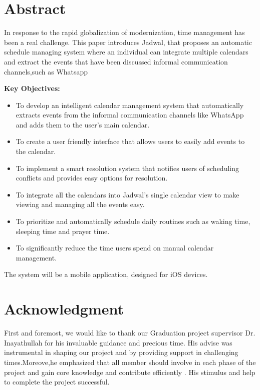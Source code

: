 \documentclass[12pt,a4paper]{report}
\begin{document}
\begin{singlespace}

\chapter*{Abstract}
    
\begin{justify}
In response to the rapid globalization of modernization, time management has been a real challenge. This paper introduces Jadwal, that proposes an automatic schedule managing system where an individual can integrate multiple calendars and extract the events that have been discussed informal communication channels,such as Whatsapp
  
\textbf{Key Objectives:}
\begin{itemize}
    \item To develop an intelligent calendar management system that automatically extracts events from the informal communication channels like WhatsApp and adds them to the user's main calendar.
    \item To create a user friendly interface that allows users to easily add events to the calendar.
    \item To implement a smart resolution system that notifies users of scheduling conflicts and provides easy options for resolution.
    \item To integrate all the calendars into Jadwal's single calendar view to make viewing and managing all the events easy.
    \item To prioritize and automatically schedule daily routines such as waking time, sleeping time and prayer time.
    \item To significantly reduce the time users spend on manual calendar management.
    
\end{itemize}


\begin{center}
    The system will be a mobile application, designed for iOS devices.
    \end{center}
\end{justify}

    
\chapter*{Acknowledgment}
    
\begin{justify}
First and foremost, we would like to thank our Graduation project supervisor Dr. Inayathullah for his invaluable guidance and precious time. His advise was instrumental in shaping our project and by providing support in challenging times.Moreove,he emphasized that all member should involve in each phase of the project and gain core knowledge and contribute efficiently .
His stimulus and help to complete the project successful.
  



\end{justify}
\end{singlespace}
\end{document}
